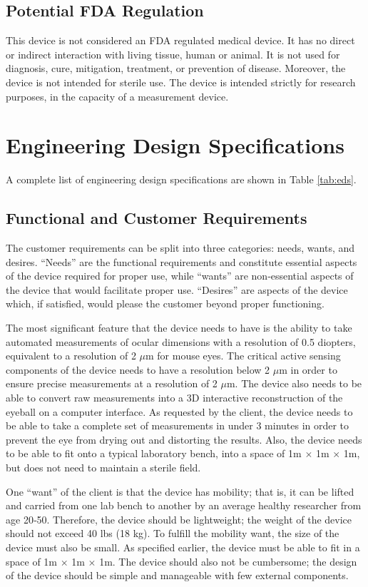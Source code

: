\documentclass{article}
\begin{document}
\subsection{Potential FDA Regulation}
\label{sec:potent-fda}

This device is not considered an FDA regulated medical device. It has
no direct or indirect interaction with living tissue, human or
animal. It is not used for diagnosis, cure, mitigation, treatment, or
prevention of disease. Moreover, the device is not intended for
sterile use. The device is intended strictly for research
purposes, in the capacity of a measurement device.

\section{Engineering Design Specifications}
A complete list of engineering design specifications are shown in Table \ref{tab:eds}.

\subsection{Functional and Customer Requirements}
The customer requirements can be split into three categories: needs, wants, and desires. ``Needs'' are the functional requirements and constitute essential aspects of the device required for proper use, while ``wants'' are non‐essential aspects of the device that would facilitate proper use. ``Desires'' are aspects of the device which, if satisfied, would please the customer beyond proper functioning.  

The most significant feature that the device needs to have is the
ability to take automated measurements of ocular dimensions with a
resolution of 0.5 diopters, equivalent to a resolution of 2 $\mu$m for
mouse eyes. The critical active sensing components of the device needs
to have a resolution below 2 $\mu$m in order to ensure precise
measurements at a resolution of 2 $\mu$m. The device also needs to be
able to convert raw measurements into a 3D interactive reconstruction
of the eyeball on a computer interface. As requested by the client,
the device needs to be able to take a complete set of measurements in
under 3 minutes in order to prevent the eye from drying out and
distorting the results. Also, the device needs to be able to fit onto
a typical laboratory bench, into a space of 1m $\times$ 1m $\times$
1m, but does not need to maintain a sterile field.

One ``want'' of the client is that the device has mobility; that is,
it can be lifted and carried from one lab bench to another by an
average healthy researcher from age 20‐50. Therefore, the device
should be lightweight; the weight of the device should not exceed 40
lbs (18 kg).\cite{gross03} To fulfill the mobility want, the size of
the device must also be small. As specified earlier, the device must
be able to fit in a space of 1m $\times$ 1m $\times$ 1m. The device
should also not be cumbersome; the design of the device should be
simple and manageable with few external components.
\end{document}
